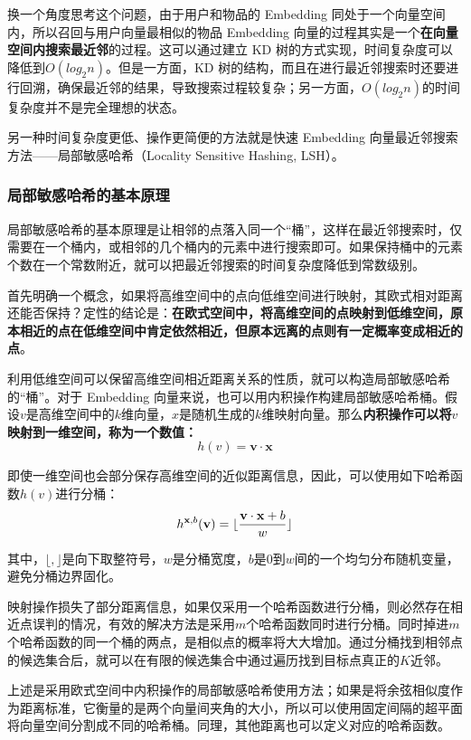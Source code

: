 \documentclass[12pt]{article}
\begin{document}
换一个角度思考这个问题，由于用户和物品的 Embedding 同处于一个向量空间内，所以召回与用户向量最相似的物品 Embedding 向量的过程其实是一个\textbf{在向量空间内搜索最近邻}的过程。这可以通过建立 KD 树的方式实现，时间复杂度可以降低到$O(log_2n)$。但是一方面，KD 树的结构，而且在进行最近邻搜索时还要进行回溯，确保最近邻的结果，导致搜索过程较复杂；另一方面，$O(log_2n)$的时间复杂度并不是完全理想的状态。

另一种时间复杂度更低、操作更简便的方法就是快速 Embedding 向量最近邻搜索方法——局部敏感哈希（Locality Sensitive Hashing, LSH）。

\subsubsection{局部敏感哈希的基本原理}
局部敏感哈希的基本原理是让相邻的点落入同一个“桶”，这样在最近邻搜索时，仅需要在一个桶内，或相邻的几个桶内的元素中进行搜索即可。如果保持桶中的元素个数在一个常数附近，就可以把最近邻搜索的时间复杂度降低到常数级别。

首先明确一个概念，如果将高维空间中的点向低维空间进行映射，其欧式相对距离还能否保持？定性的结论是：\textbf{在欧式空间中，将高维空间的点映射到低维空间，原本相近的点在低维空间中肯定依然相近，但原本远离的点则有一定概率变成相近的点}。

利用低维空间可以保留高维空间相近距离关系的性质，就可以构造局部敏感哈希的“桶”。对于 Embedding 向量来说，也可以用内积操作构建局部敏感哈希桶。假设$v$是高维空间中的$k$维向量，$x$是随机生成的$k$维映射向量。那么\textbf{内积操作可以将$v$映射到一维空间，称为一个数值：}
$$
h(v) = \mathbf{v} \cdot \mathbf{x}
$$

即使一维空间也会部分保存高维空间的近似距离信息，因此，可以使用如下哈希函数$h(v)$进行分桶：
$$
h^{\mathbf{x},b}(\mathbf{v}) = \large\lfloor\frac{\mathbf{v}\cdot \mathbf{x} + b}{w}\large\rfloor
$$

其中，$\lfloor,\rfloor$是向下取整符号，$w$是分桶宽度，$b$是0到$w$间的一个均匀分布随机变量，避免分桶边界固化。

映射操作损失了部分距离信息，如果仅采用一个哈希函数进行分桶，则必然存在相近点误判的情况，有效的解决方法是采用$m$个哈希函数同时进行分桶。同时掉进$m$个哈希函数的同一个桶的两点，是相似点的概率将大大增加。通过分桶找到相邻点的候选集合后，就可以在有限的候选集合中通过遍历找到目标点真正的$K$近邻。

上述是采用欧式空间中内积操作的局部敏感哈希使用方法；如果是将余弦相似度作为距离标准，它衡量的是两个向量间夹角的大小，所以可以使用固定间隔的超平面将向量空间分割成不同的哈希桶。同理，其他距离也可以定义对应的哈希函数。
\end{document}
